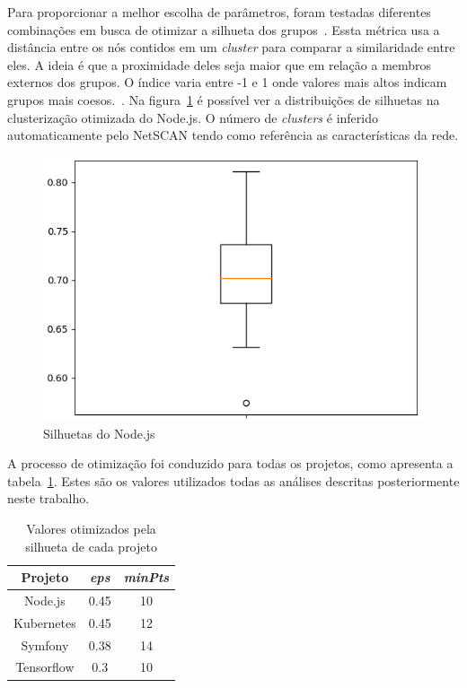 \documentclass[12pt,openany,oneside,a4paper,english,brazil]{abntbibufjf}
\begin{document}
  Para proporcionar a melhor escolha de parâmetros, foram testadas diferentes combinações em busca de otimizar a silhueta dos grupos~\cite{tan2005}. Essta métrica usa a distância entre os nós contidos em um \textit{cluster} para comparar a similaridade entre eles. A ideia é que a proximidade deles seja maior que em relação a membros externos dos grupos. O índice varia entre -1 e 1 onde valores mais altos indicam grupos mais coesos.~\cite{almeida2011}. Na figura~\ref{fig:silhouette_boxplot} é possível ver a distribuições de silhuetas na clusterização otimizada do Node.js. O número de \textit{clusters} é inferido automaticamente pelo NetSCAN tendo como referência as características da rede.

  \begin{figure}[tbp]
  \centerline{\includegraphics[width=.8\linewidth]{silhouette_boxplot}}
  \caption{Silhuetas do Node.js}
  \label{fig:silhouette_boxplot}
  \end{figure}

  A processo de otimização foi conduzido para todas os projetos, como apresenta a tabela~\ref{tab:netscan_optimize}. Estes são os valores utilizados todas as análises descritas posteriormente neste trabalho.
  \begin{table}[htbp]
  \caption{Valores otimizados pela silhueta de cada projeto}
  \begin{center}
  \begin{tabular}{|c|c|c|}
  \hline
  \textbf{Projeto} & \textbf{\textit{eps}} & \textbf{\textit{minPts}} \\
  \hline
    Node.js    & 0.45 & 10     \\
    Kubernetes & 0.45 & 12     \\
    Symfony    & 0.38 & 14     \\
    Tensorflow & 0.3  & 10    \\
  \hline
  \end{tabular}
  \label{tab:netscan_optimize}
  \end{center}
  \end{table}
\end{document}
